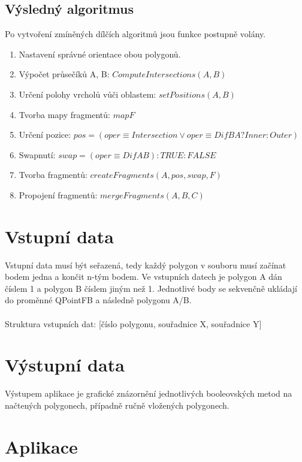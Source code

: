 \documentclass[a4paper, 12pt]{article}
\begin{document}
\subsection{Výsledný algoritmus}
Po vytvoření zmíněných dílčích algoritmů jsou funkce postupně volány.

\begin{enumerate}
\item Nastavení správné orientace obou polygonů.
\item Výpočet průsečíků A, B: $ComputeIntersections(A, B)$
\item Určení polohy vrcholů vůči oblastem: $setPositions(A, B) $
\item Tvorba mapy fragmentů: $map F$
\item Určení pozice: $pos = (oper \equiv Intersection \lor oper \equiv DifBA?Inner:Outer ) $
\item Swapnutí: $swap = (oper \equiv DifAB) : TRUE : FALSE$
\item Tvorba fragmentů: $createFragments(A, pos, swap, F)$
\item Propojení fragmentů: $mergeFragments(A, B, C)$
\end{enumerate}





\section{Vstupní data}
Vstupní data musí být seřazená, tedy každý polygon v souboru musí začínat bodem jedna a končit n-tým bodem.  Ve vstupních datech je polygon A dán číslem 1 a polygon B číslem jiným než 1. Jednotlivé body se sekvenčně ukládají do proměnné QPointFB a následně polygonu A/B.\\
\\
Struktura vstupních dat:
[číslo polygonu, souřadnice X, souřadnice Y]


\section{Výstupní data}
Výstupem aplikace je grafické znázornění jednotlivých booleovských metod na načtených polygonech, případně ručně vložených polygonech.


\clearpage
\section{Aplikace}
\end{document}
